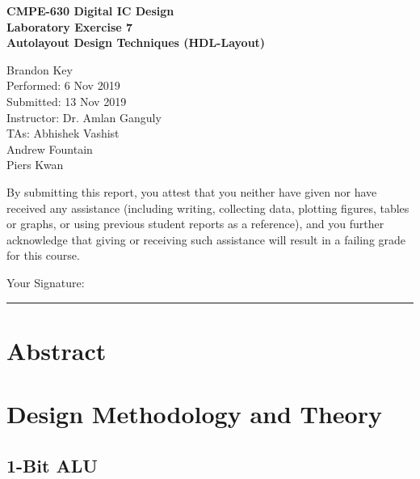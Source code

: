 \documentclass[11pt]{article}
\begin{document}
%
%

\vspace*{2 cm}

\begin{center}
\bf{CMPE-630 Digital IC Design\\
    Laboratory Exercise 7\\
\vspace{0.25 cm}
Autolayout Design Techniques (HDL-Layout)
}
\end{center}

\vspace{6 cm}

\begin{flushright}
Brandon Key\\
Performed: 6 Nov 2019\\
Submitted: 13 Nov 2019\\
\vspace{0.5 cm}
Instructor: Dr. Amlan Ganguly\\
TAs: Abhishek Vashist\\
Andrew Fountain\\
Piers Kwan\\
\vspace{0.5 cm}
\end{flushright}

\vspace{3 cm}
\indent By submitting this report, you attest that you neither have given nor have received any assistance (including writing, collecting data, plotting figures, tables or graphs, or using previous student reports as a reference), and you further acknowledge that giving or receiving such assistance will result in a failing grade for this course.

\vspace{1 cm}
Your Signature:   \rule{13cm}{.1pt}


\newpage

\section{Abstract}
	

\section{Design Methodology and Theory}

	\subsection{1-Bit ALU}	
\end{document}

